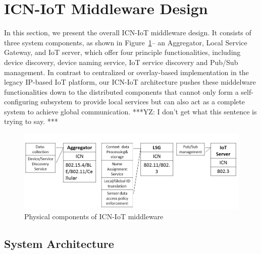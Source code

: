 \section{ICN-IoT Middleware Design}
In this section, we present the overall ICN-IoT middleware design. It consists of three system components, as shown in Figure~\ref{fig:phy}-- an Aggregator, Local Service Gateway, and IoT server, which offer four principle functionalities, including device discovery, device naming service, IoT service discovery and Pub/Sub management.
In contrast to centralized or overlay-based implementation in the legacy IP-based IoT platform, our ICN-IoT architecture pushes these middelware functionalities down to the distributed components that cannot only form a self-configuring subsystem to provide local services but can also act as a complete system to achieve global communication. ***YZ: I don't get what this sentence is trying to say. ***
\begin{figure}
\includegraphics[width=\columnwidth]{figure/physical_comp.png}
\caption{\label{fig:phy}Physical components of ICN-IoT middleware}
\end{figure}

\subsection{System Architecture}\label{sec:physical}

